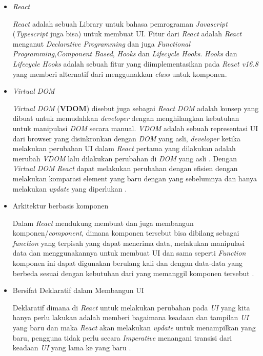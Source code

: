 \documentclass[a4paper]{article}
\begin{document}
\begin{enumerate}[label=\alph*. ]
\begin{enumerate}
\begin{itemize}
                        \item \textit{React}

                        \textit{React} adalah sebuah Library untuk bahasa pemrograman \textit{Javascript} (\textit{Typescript} juga bisa) untuk membuat UI. Fitur dari \textit{React} adalah \textit{React} menganut \textit{Declarative Programming} dan juga \textit{Functional Programming},\textit{Component Based}, \textit{Hooks} dan \textit{Lifecycle Hooks}\autocite{react-general}. \textit{Hooks} dan \textit{Lifecycle Hooks} adalah sebuah fitur yang diimplementasikan pada \textit{React v16.8} yang memberi alternatif dari menggunakkan \textit{class} untuk komponen\autocite{react-hooks, react-hooks-lifecycle}.

                        \item \textit{Virtual DOM}

                        \textit{Virtual DOM} (\textbf{VDOM}) disebut juga sebagai \textit{React} \textit{DOM} adalah konsep yang dibuat untuk memudahkan \textit{developer} dengan menghilangkan kebutuhan untuk manipulasi \textit{DOM} secara manual. \textit{VDOM} adalah sebuah representasi UI dari browser yang disinkronkan dengan \textit{DOM} yang asli, \textit{developer} ketika melakukan perubahan UI dalam \textit{React} pertama yang dilakukan adalah merubah \textit{VDOM} lalu dilakukan perubahan di \textit{DOM} yang asli \autocite{React_VDOM_DOM}. Dengan \textit{Virtual DOM} \textit{React} dapat melakukan perubahan dengan efisien dengan melakukan komparasi element yang baru dengan yang sebelumnya dan hanya melakukan \textit{update} yang diperlukan \autocite{React_rendering_needed}.

                        \item Arkitektur berbasis komponen

                        Dalam \textit{React} mendukung membuat dan juga membangun komponen/\textit{component}, dimana komponen tersebut bisa dibilang sebagai \textit{function} yang terpisah yang dapat menerima data, melakukan manipulasi data dan menggunakannya untuk membuat UI dan sama seperti \textit{Function} komponen ini dapat digunakan berulang kali dan dengan data-data yang berbeda sesuai dengan kebutuhan dari yang memanggil komponen tersebut \autocite{React_official}.

                        \item Bersifat Deklaratif dalam Membangun UI

                        Deklaratif dimana di \textit{React} untuk melakukan perubahan pada \textit{UI} yang kita hanya perlu lakukan adalah memberi bagaimana keadaan dan tampilan \textit{UI} yang baru dan maka \textit{React} akan melakukan \textit{update} untuk menampilkan yang baru, pengguna tidak perlu secara \textit{Imperative} menangani transisi dari keadaan \textit{UI} yang lama ke yang baru \autocite{React_official}.


\end{itemize}
\end{enumerate}
\end{enumerate}
\end{document}
